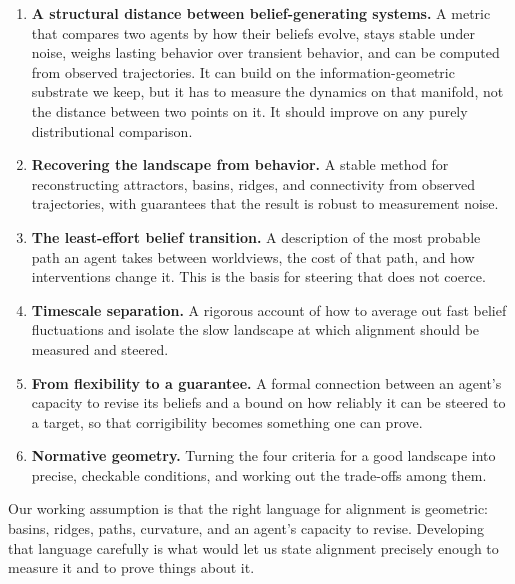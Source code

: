 \documentclass[11pt,a4paper]{article}
\begin{document}
\begin{enumerate}[leftmargin=1.6em]
\item \textbf{A structural distance between belief-generating systems.} A
metric that compares two agents by how their beliefs evolve, stays stable under
noise, weighs lasting behavior over transient behavior, and can be computed
from observed trajectories. It can build on the information-geometric substrate
we keep, but it has to measure the dynamics on that manifold, not the distance
between two points on it. It should improve on any purely distributional
comparison.

\item \textbf{Recovering the landscape from behavior.} A stable method for
reconstructing attractors, basins, ridges, and connectivity from observed
trajectories, with guarantees that the result is robust to measurement noise.

\item \textbf{The least-effort belief transition.} A description of the most
probable path an agent takes between worldviews, the cost of that path, and how
interventions change it. This is the basis for steering that does not coerce.

\item \textbf{Timescale separation.} A rigorous account of how to average out
fast belief fluctuations and isolate the slow landscape at which alignment
should be measured and steered.

\item \textbf{From flexibility to a guarantee.} A formal connection between an
agent's capacity to revise its beliefs and a bound on how reliably it can be
steered to a target, so that corrigibility becomes something one can prove.

\item \textbf{Normative geometry.} Turning the four criteria for a good
landscape into precise, checkable conditions, and working out the trade-offs
among them.
\end{enumerate}

Our working assumption is that the right language for alignment is geometric:
basins, ridges, paths, curvature, and an agent's capacity to revise. Developing
that language carefully is what would let us state alignment precisely enough to
measure it and to prove things about it.
\end{document}

